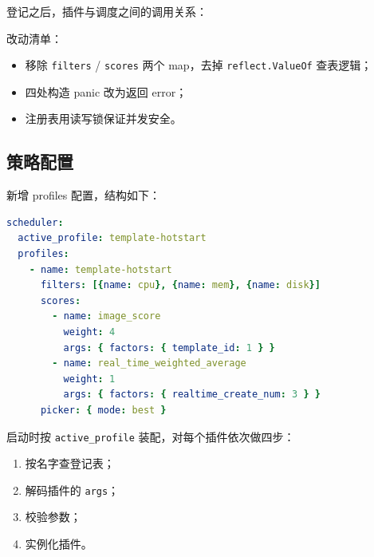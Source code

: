 \documentclass[UTF8,fontset=none,zihao=-4]{ctexart}
\newcommand{\code}[1]{\colorbox{gray!12}{\texttt{#1}}}
\begin{document}
登记之后，插件与调度之间的调用关系：

\begin{center}
\end{center}

改动清单：

\begin{itemize}
  \item 移除 \code{filters} / \code{scores} 两个 map，去掉 \code{reflect.ValueOf} 查表逻辑；
  \item 四处构造 panic 改为返回 error；
  \item 注册表用读写锁保证并发安全。
\end{itemize}

\subsection*{策略配置}

新增 profiles 配置，结构如下：

\begin{lstlisting}[language=yaml]
scheduler:
  active_profile: template-hotstart
  profiles:
    - name: template-hotstart
      filters: [{name: cpu}, {name: mem}, {name: disk}]
      scores:
        - name: image_score
          weight: 4
          args: { factors: { template_id: 1 } }
        - name: real_time_weighted_average
          weight: 1
          args: { factors: { realtime_create_num: 3 } }
      picker: { mode: best }
\end{lstlisting}

启动时按 \code{active\_profile} 装配，对每个插件依次做四步：

\begin{enumerate}
  \item 按名字查登记表；
  \item 解码插件的 \code{args}；
  \item 校验参数；
  \item 实例化插件。
\end{enumerate}
\end{document}
